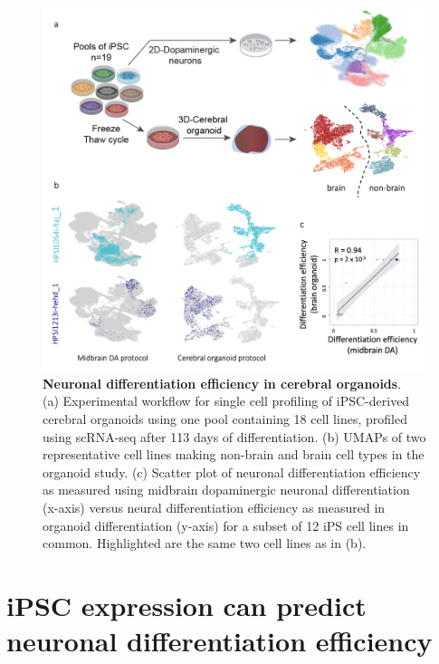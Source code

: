 \begin{figure}[htbp]
\centering
\includegraphics[width=14cm]{Chapter5/Fig/neuroseq_organoids.png}
\caption[Neuronal differentiation efficiency in cerebral organoids]{\textbf{Neuronal differentiation efficiency in cerebral organoids}.\\
(a) Experimental workflow for single cell profiling of iPSC-derived cerebral organoids using one pool containing 18 cell lines, profiled using scRNA-seq after 113 days of differentiation.
(b) UMAPs of two representative cell lines making non-brain and brain cell types in the organoid study. 
(c) Scatter plot of neuronal differentiation efficiency as measured using midbrain dopaminergic neuronal differentiation (x-axis) versus neural differentiation efficiency as measured in organoid differentiation (y-axis) for a subset of 12 iPS cell lines in common. 
Highlighted are the same two cell lines as in (b).}
\label{fig:neuroseq_organoids}
\end{figure}


\clearpage

\section{iPSC expression can predict neuronal differentiation efficiency}
\label{sec:neuroseq_ips}


